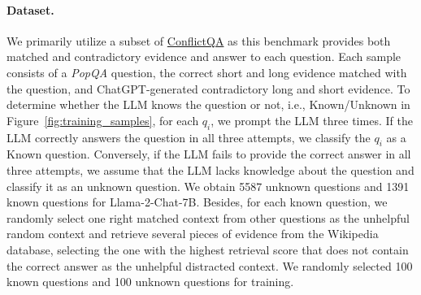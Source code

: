 
\paragraph{Dataset.} We primarily utilize a subset of \href{https://github.com/OSU-NLP-Group/LLM-Knowledge-Conflict/tree/main}{ConflictQA} \cite{xieadaptive} as this benchmark provides both matched and contradictory evidence and answer to each question. Each sample consists of a \textit{PopQA} \cite{mallen-etal-2023-trust} question, the correct short and long evidence matched with the question, and ChatGPT-generated contradictory long and short evidence. To determine whether the LLM knows the question or not, i.e., Known/Unknown in Figure~\ref{fig:training_samples}, for each $q_i$, we prompt the LLM three times. If the LLM correctly answers the question in all three attempts, we classify the $q_i$ as a Known question. Conversely, if the LLM fails to provide the correct answer in all three attempts, we assume that the LLM lacks knowledge about the question and classify it as an unknown question. We obtain 5587 unknown questions and 1391 known questions for Llama-2-Chat-7B. Besides, for each known question, we randomly select one right matched context from other questions as the unhelpful random context and retrieve several pieces of evidence from the Wikipedia database, selecting the one with the highest retrieval score that does not contain the correct answer  as the unhelpful distracted context. We randomly selected 100 known questions and 100 unknown questions for training. 

